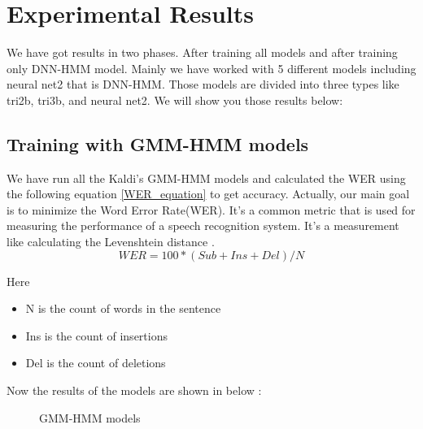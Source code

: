 \documentclass{standalone}
\begin{document}
\chapter{Experimental Results}
We have got results in two phases. After training all models and after training only DNN-HMM model.
Mainly we have worked with 5 different models including neural net2 that is DNN-HMM. Those models are divided into three types like tri2b, tri3b, and neural net2.
We will show you those results below:

\section{Training  with GMM-HMM models}
We have run all the Kaldi's GMM-HMM models and calculated the WER using the following equation \ref{WER_equation} to get accuracy. Actually, our main goal is to minimize the Word Error Rate(WER). It's a common metric that is used for measuring the performance of a speech recognition system. It's a measurement like calculating the Levenshtein distance \cite{huang2014historical}.
\\
    \begin{equation}\label{WER_equation}
    WER = 100 * (Sub + Ins + Del)/N
    \end{equation}

Here
\begin{itemize}
\item N is the count of words in the sentence
\item Ins is the count of insertions
\item Del is the count of deletions
\end{itemize}

Now the results of the models are shown in below : 

\begin{figure}[H]
 \centering
 \caption{GMM-HMM models}
\label{fig:Models}
\end{figure}
\end{document}
